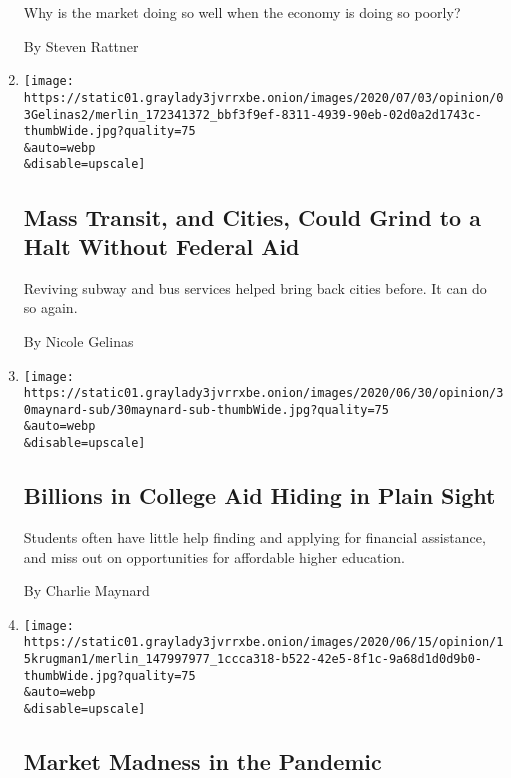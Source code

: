 \begin{enumerate}
  Why is the market doing so well when the economy is doing so poorly?

  By Steven Rattner
\item
  \href{/2020/07/03/opinion/coronavirus-mass-transit.html}{}

  \texttt{[image: https://static01.graylady3jvrrxbe.onion/images/2020/07/03/opinion/03Gelinas2/merlin\_172341372\_bbf3f9ef-8311-4939-90eb-02d0a2d1743c-thumbWide.jpg?quality=75\\\&auto=webp\\\&disable=upscale]}

  \hypertarget{mass-transit-and-cities-could-grind-to-a-halt-without-federal-aid}{%
  \subsection{Mass Transit, and Cities, Could Grind to a Halt Without
  Federal
  Aid}\label{mass-transit-and-cities-could-grind-to-a-halt-without-federal-aid}}

  Reviving subway and bus services helped bring back cities before. It
  can do so again.

  By Nicole Gelinas
\item
  \href{/2020/06/30/opinion/college-financial-aid.html}{}

  \texttt{[image: https://static01.graylady3jvrrxbe.onion/images/2020/06/30/opinion/30maynard-sub/30maynard-sub-thumbWide.jpg?quality=75\\\&auto=webp\\\&disable=upscale]}

  \hypertarget{billions-in-college-aid-hiding-in-plain-sight}{%
  \subsection{Billions in College Aid Hiding in Plain
  Sight}\label{billions-in-college-aid-hiding-in-plain-sight}}

  Students often have little help finding and applying for financial
  assistance, and miss out on opportunities for affordable higher
  education.

  By Charlie Maynard
\item
  \href{/2020/06/15/opinion/coronavirus-stock-market.html}{}

  \texttt{[image: https://static01.graylady3jvrrxbe.onion/images/2020/06/15/opinion/15krugman1/merlin\_147997977\_1ccca318-b522-42e5-8f1c-9a68d1d0d9b0-thumbWide.jpg?quality=75\\\&auto=webp\\\&disable=upscale]}

  \hypertarget{market-madness-in-the-pandemic}{%
  \subsection{Market Madness in the
  Pandemic}\label{market-madness-in-the-pandemic}}


\end{enumerate}
